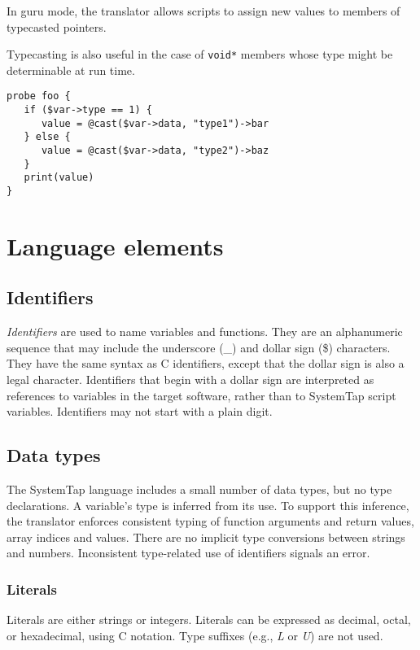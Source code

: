 \documentclass[twoside,english]{article}
\newenvironment{vindent}
{\begin{list}{}{\setlength{\listparindent}{6pt}}
\item[]}
{\end{list}}
\begin{document}
In guru mode, the translator allows scripts to assign new values to
members of typecasted pointers.

Typecasting is also useful in the case of \texttt{void*} members whose
type might be determinable at run time.
\begin{vindent}
\begin{verbatim}
probe foo {
   if ($var->type == 1) {
      value = @cast($var->data, "type1")->bar
   } else {
      value = @cast($var->data, "type2")->baz
   }
   print(value)
}
\end{verbatim}
\end{vindent}


\section{Language elements\label{sec:Language-Elements}}
\subsection{Identifiers}
\emph{Identifiers} are used to name variables and functions. They are an
alphanumeric sequence that may include the underscore (\_) and dollar sign
(\$) characters. They have the same syntax as C identifiers, except that
the dollar sign is also a legal character. Identifiers that begin with a
dollar sign are interpreted as references to variables in the target software,
rather than to SystemTap script variables. Identifiers may not start with
a plain digit.


\subsection{Data types\label{sub:Data-types}}
The SystemTap language includes a small number of data types, but no type
declarations. A variable's type is inferred from its use.
To support this inference, the translator enforces consistent typing of function
arguments and return values, array indices and values. There are no implicit
type conversions between strings and numbers. Inconsistent type-related use
of identifiers signals an error.


\subsubsection{Literals}
Literals are either strings or integers. Literals can be expressed as decimal,
octal, or hexadecimal, using C notation. Type suffixes (e.g., \emph{L} or
\emph{U}) are not used.
\end{document}
